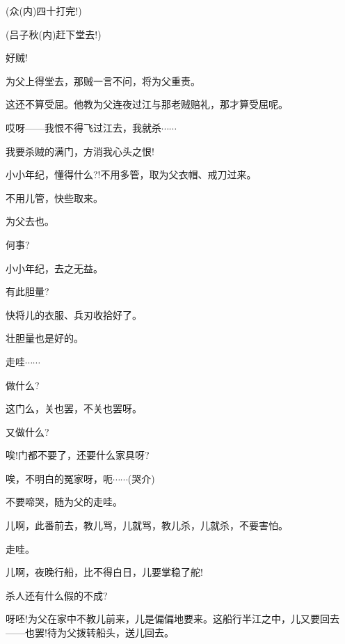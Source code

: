 {{(众\hspace{40pt}({\akai 内})四十打完!)}

{(吕子秋\hspace{20pt}({\akai 内})赶下堂去!)}

{好贼!}



{为父上得堂去，那贼一言不问，将为父重责。}

{这还不算受屈。他教为父连夜过江与那老贼赔礼，那才算受屈呢。}

{哎呀------我恨不得飞过江去，我就杀$\cdots{}\cdots{}$}

{我要杀贼的满门，方消我心头之恨!}

{小小年纪，懂得什么?!不用多管，取为父衣帽、戒刀过来。}

{不用儿管，快些取来。}

{为父去也。}

{何事?}

{小小年纪，去之无益。}

{有此胆量?}

{快将儿的衣服、兵刃收拾好了。}

{壮胆量也是好的。}

{走哇$\cdots{}\cdots{}$}

{做什么?}

{这门么，关也罢，不关也罢呀。}

{又做什么?}

{唉!门都不要了，还要什么家具呀?}

{唉，不明白的冤家呀，呃$\cdots{}\cdots{}$({\hwfs 哭介})}

{不要啼哭，随为父的走哇。}

{儿啊，此番前去，教儿骂，儿就骂，教儿杀，儿就杀，不要害怕。}

{走哇。}

{儿啊，夜晚行船，比不得白日，儿要掌稳了舵!}



{杀人还有什么假的不成?}

{呀呸!为父在家中不教儿前来，儿是偏偏地要来。这船行半江之中，儿又要回去------也罢!待为父拨转船头，送儿回去。}

}
